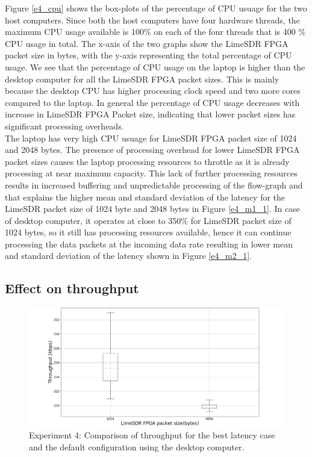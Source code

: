 Figure \ref{e4_cpu} shows the box-plots of the percentage of CPU usuage for the two host computers.
Since both the host computers have four hardware threads, the maximum CPU usage available is 100\% on each of the four threads that is 400 \% CPU usage in total.
The x-axis of the two graphs show the LimeSDR FPGA packet size in bytes, with the y-axis representing the total percentage of CPU usage.
We see that the percentage of CPU usage on the laptop is higher than the desktop computer for all the LimeSDR FPGA packet sizes.
This is mainly because the desktop CPU has higher processing clock speed and two more cores compared to the laptop.
In general the percentage of CPU usage decreases with increase in LimeSDR FPGA Packet size, indicating that lower packet sizes has significant processing overheads. \\

The laptop has very high CPU usuage for LimeSDR FPGA packet size of 1024 and 2048 bytes. The presence of processing overhead for lower LimeSDR FPGA packet sizes causes the laptop processing resources to throttle as it is already processing at near maximum capacity.
This lack of further processing resources results in increased buffering and unpredictable processing of the flow-graph and that explains the higher mean and standard deviation of the latency for the LimeSDR packet size of 1024 byte and 2048 bytes in Figure \ref{e4_m1_1}.
In case of desktop computer, it operates at close to 350\% for LimeSDR packet size of 1024 bytes, so it still has processing resources available, hence it can continue processing the data packets at the incoming data rate resulting in lower mean and standard deviation of the latency shown in Figure \ref{e4_m2_1}.

\subsection{Effect on throughput}

\begin{figure}[h!]
\centering
\includegraphics[width=\textwidth]{Thesis/Figure/throughput.png}
\caption{Experiment 4: Comparison of throughput for the best latency case and the default configuration using the desktop computer.}
\label{e4_throughput}
\end{figure}

